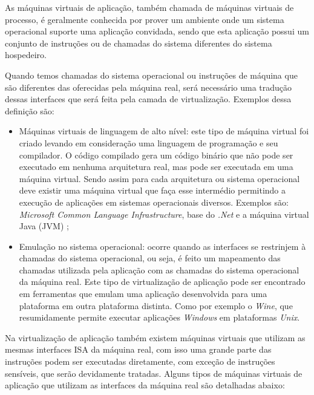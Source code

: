 As máquinas virtuais de aplicação, também chamada de máquinas virtuais de processo, é geralmente conhecida por prover um ambiente
onde um sistema operacional suporte uma aplicação convidada, sendo que esta aplicação possui um conjunto de instruções ou de chamadas
do sistema diferentes do sistema hospedeiro.

Quando temos chamadas do sistema operacional ou instruções de máquina que são diferentes das oferecidas pela máquina real, será necessário
uma tradução dessas interfaces que será feita pela camada de virtualização. Exemplos dessa definição são:

\begin{itemize}
 \item Máquinas virtuais de linguagem de alto nível: este tipo de máquina virtual foi criado levando em consideração uma linguagem de 
 programação e seu compilador. O código compilado gera um código binário que não pode ser executado em nenhuma arquitetura real, mas pode
 ser executada em uma máquina virtual. Sendo assim para cada arquitetura ou sistema operacional deve existir uma máquina virtual que faça
 esse intermédio permitindo a execução de aplicações em sistemas operacionais diversos. Exemplos são: \textit{Microsoft Common Language 
 Infrastructure}, base do \textit{.Net} e a máquina virtual Java (\ac{JVM}) \cite{carissimi2008};
 \item Emulação no sistema operacional: ocorre quando as interfaces se restrinjem à chamadas do sistema operacional, ou seja,
 é feito um mapeamento das chamadas utilizada pela aplicação com as chamadas do sistema operacional da máquina real. Este tipo de 
 virtualização de aplicação pode ser encontrado em ferramentas que emulam uma aplicação desenvolvida para uma plataforma em outra
 plataforma distinta. Como por exemplo o \textit{Wine}, que resumidamente permite executar aplicações \textit{Windows} em plataformas
 \textit{Unix}.
\end{itemize}

Na virtualização de aplicação também existem máquinas virtuais que utilizam as mesmas interfaces \ac{ISA} da máquina real,
com isso uma grande parte das instruções podem ser executadas diretamente, com exceção de instruções sensíveis, que serão devidamente
tratadas. Alguns tipos de máquinas virtuais de aplicação que utilizam as interfaces da máquina real são detalhadas abaixo:


